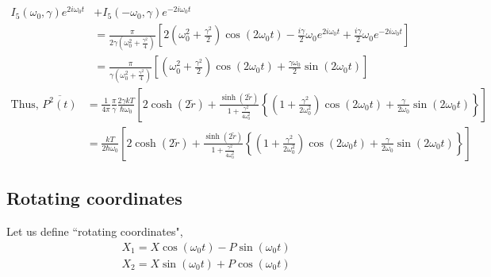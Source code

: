 \documentclass[12pt, twoside]{article}
\begin{document}
$\begin{aligned}
I_5(\omega_0,\gamma)e^{2i\omega_0 t} &+I_5(-\omega_0,\gamma)e^{-2i\omega_0 t} 
\\&= \frac { \pi } { 2\gamma \left( \omega _ { 0 } ^ { 2 } + \frac { \gamma ^ { 2 } } { 4 } \right) } \left[2 \left( \omega _ { 0 } ^ { 2 } + \frac { \gamma ^ { 2 } } { 2 } \right) \cos \left( 2 \omega _ { 0 } t \right) - \frac { i\gamma } { 2 } \omega _ { 0 } e ^ { 2 i \omega _ { 0 } t } + \frac { i\gamma } { 2 } \omega _ { 0 } e ^ {-2 i \omega _ { 0 } t }\right] 
\\&= \frac { \pi } { \gamma \left( \omega _ { 0 } ^ { 2 } + \frac { \gamma ^ { 2 } } { 4 } \right) } \left[ \left( \omega _ { 0 } ^ { 2 } + \frac { \gamma ^ { 2 } } { 2 } \right) \cos \left( 2 \omega _ { 0 } t \right)  + \frac { \gamma \omega _ { 0 } } { 2 } \sin \left( 2 \omega _ { 0 } t \right) \right] 
\end{aligned}$
\begin{equation}\begin{aligned}\label{eq:p_average} \text{Thus, }
\overline{P ^ { 2 } ( t )} & = \frac{1}{4\pi} \frac{\pi}{\gamma} \frac{2\gamma k T}{\hbar \omega_0} \left[2\cosh(2\tilde{r}) + \frac{\sinh(2\tilde{r})}{1 + \frac{\gamma^2}{4\omega_0 ^2}}\left\{(1+\frac{\gamma^2}{2\omega_0 ^2})\cos(2\omega_0 t) + \frac{\gamma}{2 \omega_0}\sin(2\omega_0 t)\right\}\right] \\& = \frac{kT}{2 \hbar \omega_0} \left[2\cosh(2\tilde{r}) + \frac{\sinh(2\tilde{r})}{1 + \frac{\gamma^2}{4\omega_0 ^2}}\left\{(1+\frac{\gamma^2}{2\omega_0 ^2})\cos(2\omega_0 t) + \frac{\gamma}{2 \omega_0}\sin(2\omega_0 t)\right\}\right]
\end{aligned}\end{equation}
\subsection{Rotating coordinates}\label{rotating_coordinates}
Let us define ``rotating coordinates", \begin{equation}\begin{array} { l } { X _ { 1 } = X \cos \left( \omega _ { 0 } t \right) - P \sin ( \omega_0  t ) } \\ { X _ { 2 } = X \sin ( \omega_0  t ) + P \cos ( \omega_0  t ) } \end{array}\end{equation}
\end{document}
